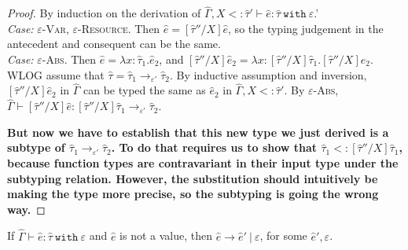 \documentclass{llncs}
\newcommand{\keywadj}[1]{\mathtt{#1}}
\newcommand{\keyw}[1]{\keywadj{#1}~}
\newcommand{\kw}[1]{\keyw{ #1 }}
\begin{document}
\begin{proof} By induction on the derivation of $\hat \Gamma, X <: \hat \tau' \vdash \hat e: \hat \tau~\kw{with} \varepsilon$.'\\

\textit{Case:} \textsc{$\varepsilon$-Var, $\varepsilon$-Resource}. Then $\hat e = [\hat \tau''/X]\hat e$, so the typing judgement in the antecedent and consequent can be the same.\\

\textit{Case:} \textsc{$\varepsilon$-Abs}. Then $\hat e = \lambda x: \hat \tau_1. \hat e_2$, and $[\hat \tau''/X]\hat e_2 = \lambda x: [\hat \tau''/X]\hat \tau_1. [\hat \tau''/X]\hat e_2$. WLOG assume that $\hat \tau = \hat \tau_1 \rightarrow_{\varepsilon'} \hat \tau_2$. By inductive assumption and inversion, $[\hat \tau''/X]\hat e_2$  in $\hat \Gamma$ can be typed the same as $\hat e_2$ in $\hat \Gamma, X <: \hat \tau'$. By \textsc{$\varepsilon$-Abs}, $\hat \Gamma \vdash [\hat \tau''/X]\hat e : [\hat \tau''/X]\hat \tau_1 \rightarrow_{\varepsilon'} \hat \tau_2$.

\textbf{But now we have to establish that this new type we just derived is a subtype of $\hat \tau_1 \rightarrow_{\varepsilon'} \hat \tau_2$. To do that requires us to show that $\hat \tau_1 <: [\hat \tau''/X]\hat \tau_1$, because function types are contravariant in their input type under the subtyping relation. However, the substitution should intuitively be making the type more precise, so the subtyping is going the wrong way. }

\end{proof}



\hrulefill

\begin{theorem}[Progress]
If $\hat \Gamma \vdash \hat e: \hat \tau~\kw{with} \varepsilon$ and $\hat e$ is not a value, then $\hat e \longrightarrow \hat e'~|~\varepsilon$, for some $\hat e', \varepsilon$.
\end{theorem}
\end{document}

